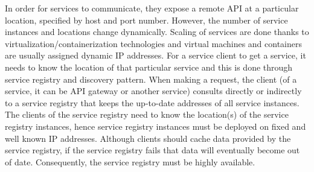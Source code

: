 \documentclass{Configuration_Files/PoliMi3i_thesis}
\begin{document}
In order for services to communicate, they expose a remote API at a particular location, specified by host and port number.
However, the number of service instances and locations change dynamically.
Scaling of services are done thanks to virtualization/containerization technologies and virtual machines and containers are usually assigned dynamic IP addresses.
For a service client to get a service, it needs to know the location of that particular service and this is done through service registry and discovery pattern.
When making a request, the client (of a service, it can be API gateway or another service) consults directly or indirectly to a service registry that keeps the up-to-date addresses of all service instances.
The clients of the service registry need to know the location(s) of the service registry instances, hence service registry instances must be deployed on fixed and well known IP addresses.
Although clients should cache data provided by the service registry, if the service registry fails that data will eventually become out of date. 
Consequently, the service registry must be highly available.
\end{document}

